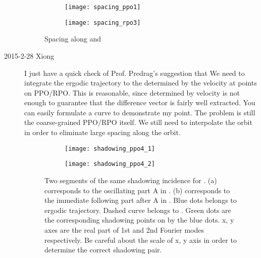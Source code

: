 \begin{description}
  \begin{figure}[h]
    \centering
    \begin{subfigure}[b]{0.48\linewidth}
      \centering
      \texttt{[image: spacing\_ppo1]}
      \caption{}
      \label{fig:spacing_ppo1}
    \end{subfigure}
    \hfill
    \begin{subfigure}[b]{0.48\linewidth}
      \centering
      \texttt{[image: spacing\_rpo3]}
      \caption{}
      \label{fig:spacing_rpo3}
    \end{subfigure}

    \caption{
      Spacing along  and 
    }
    \label{fig:spacing_ppo1rpo3}
  \end{figure}

\item[2015-2-28 Xiong] I just have a quick check of Prof. Predrag's
    suggestion that We need to integrate the ergodic trajectory to the
    {\PoincSec} determined by the velocity at points on PPO/RPO. This
    is reasonable, since {\PoincSec} determined by velocity is not
    enough to guarantee that the difference vector is fairly well
    extracted. You can easily formulate a curve to demonstrate my
    point. The problem is still the coarse-grained PPO/RPO itself. We
    still need to interpolate the orbit in order to eliminate large
    spacing along the orbit.


\begin{figure}[h]
  \centering
  \begin{subfigure}[b]{0.48\linewidth}
    \centering
    \texttt{[image: shadowing\_ppo4\_1]}
    \caption{}
    \label{fig:shadowing_ppo4_1}
  \end{subfigure}
  \hfill
  \begin{subfigure}[b]{0.48\linewidth}
    \centering
    \texttt{[image: shadowing\_ppo4\_2]}
    \caption{}
    \label{fig:shadowing_ppo4_1}
  \end{subfigure}

  \caption{
    Two segments of the same shadowing incidence for .
    (a) corresponds to the oscillating part A in .
    (b) corresponds to the immediate following part after A in .
    Blue dots belongs to ergodic trajectory. Dashed curve belongs to .
    Green dots are the corresponding shadowing points on  by the blue dots.
    x, y axes are the real part of 1st and 2nd Fourier modes respectively.
    Be careful about the scale of x, y axis in order to determine the correct shadowing
    pair.
  }
  \label{fig:spacing_ppo1rpo3}
\end{figure}


\end{description}

